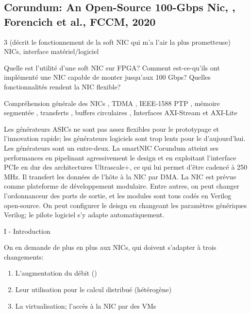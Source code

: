 
\subsection{Corundum: An Open-Source 100-Gbps Nic, \cite{forencich_corundum_2020}, Forencich et al., FCCM, 2020}

 3 (décrit le fonctionnement de la soft NIC qui m'a l'air la plus prometteuse)
 NICs, interface matériel/logiciel

 Quelle est l'utilité d'une soft NIC sur FPGA? Comment est-ce-qu'ils ont implémenté une NIC capable de monter jusqu'aux 100 Gbps? Quelles fonctionnalités rendent la NIC flexible?

 Compréhension générale des NICs \cite{patterson_computer_2017}, TDMA \cite{noauthor_time-division_2022}, IEEE-1588 PTP \cite{noauthor_precision_2023}, mémoire segmentée \cite{noauthor_memory_2023}, transferts  \cite{noauthor_gatherscatter_nodate}, buffers circulaires \cite{noauthor_circular_2023} \cite{wada_ring_2013}, Interfaces AXI-Stream et AXI-Lite \cite{dan_guisselquist_learning_2022} \cite{dan_guisselquist_axi_2021} \cite{dan_guisselquist_using_2018} \cite{dan_guisselquist_building_2019}

 Les générateurs ASICs ne sont pas assez flexibles pour le prototypage et l'innovation rapide; les générateurs logiciels sont trop lents pour le  d'aujourd'hui. Les générateurs sont un entre-deux. La smartNIC Corundum atteint ses performances en  pipelinant agressivement le design et en exploitant l'interface PCIe en dur des architectures Ultrascale+, ce qui lui permet d'être cadencé à 250 MHz. Il transfert les données de l'hôte à la NIC par DMA.
La NIC est prévue comme plateforme de développement modulaire. Entre autres, on peut changer l'ordonnanceur des ports de sortie, et les modules sont tous codés en Verilog open-source. On peut configurer le deisgn en changeant les paramètres génériques Verilog; le pilote logiciel s'y adapte automatiquement.



I - Introduction

On en demande de plus en plus aux NICs, qui doivent s'adapter à trois changements:
\begin{enumerate}
	\item L'augmentation du débit ()
	\item Leur utilisation pour le calcul distribué (hétérogène)
	\item La virtualisation; l'accès à la NIC par des VMs
\end{enumerate}

